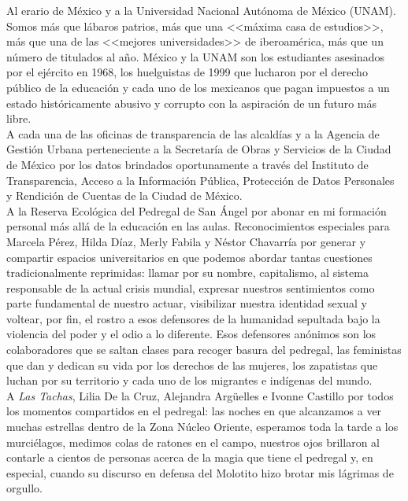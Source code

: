 Al erario de México y a la Universidad Nacional Autónoma de México (UNAM). Somos más que lábaros patrios, más que una <<máxima casa de estudios>>, más que una de las <<mejores universidades>> de iberoamérica, más que un número de titulados al año. México y la UNAM son los estudiantes asesinados por el ejército en 1968, los huelguistas de 1999 que lucharon por el derecho público de la educación y cada uno de los mexicanos que pagan impuestos a un estado históricamente abusivo y corrupto con la aspiración de un futuro más libre.\\

A cada una de las oficinas de transparencia de las alcaldías y a la Agencia de Gestión Urbana perteneciente a la Secretaría de Obras y Servicios de la Ciudad de México  por los datos brindados oportunamente a través del Instituto de Transparencia, Acceso a la Información Pública, Protección de Datos Personales y Rendición de Cuentas de la Ciudad de México.\\

A la Reserva Ecológica del Pedregal de San Ángel por abonar en mi formación personal más allá de la educación en las aulas. Reconocimientos especiales para Marcela Pérez, Hilda Díaz, Merly Fabila y Néstor Chavarría por generar y compartir espacios universitarios en que podemos abordar tantas cuestiones tradicionalmente reprimidas: llamar por su nombre, capitalismo, al sistema responsable de la actual crisis mundial, expresar nuestros sentimientos como parte fundamental de nuestro actuar, visibilizar nuestra identidad sexual y voltear, por fin, el rostro a esos defensores de la humanidad sepultada bajo la violencia del poder y el odio a lo diferente. Esos defensores anónimos son los colaboradores que se saltan clases para recoger basura del pedregal, las feministas que dan y dedican su vida por los derechos de las mujeres, los zapatistas que luchan por su territorio y cada uno de los migrantes e indígenas del mundo.\\

A \textit{Las Tachas}, Lilia De la Cruz, Alejandra Argüelles e Ivonne Castillo por todos los momentos compartidos en el pedregal: las noches en que alcanzamos a ver muchas estrellas dentro de la Zona Núcleo Oriente, esperamos toda la tarde a los murciélagos, medimos colas de ratones en el campo, nuestros ojos brillaron al contarle a cientos de personas acerca de la magia que tiene el pedregal y, en especial, cuando su discurso en defensa del Molotito hizo brotar mis lágrimas de orgullo.\\ 

